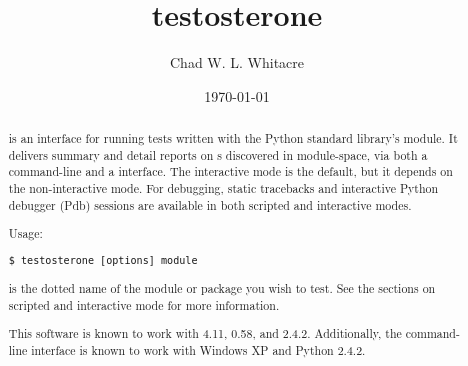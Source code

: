 \documentclass{manual}
\title{testosterone}
\author{Chad W. L. Whitacre}
\date\today
\begin{document}
\maketitle

\begin{abstract}

\noindent

 is an interface for running tests written with the Python
standard library's  module. It delivers summary and detail
reports on s discovered in module-space, via both a command-line
and a  interface. The interactive mode is the default, but it
depends on the non-interactive mode. For debugging, static tracebacks and
interactive Python debugger (Pdb) sessions are available in both scripted and
interactive modes.

Usage:

\begin{verbatim}
$ testosterone [options] module
\end{verbatim}

 is the dotted name of the module or package you wish to test. See
the sections on scripted and interactive mode for more information.

This software is known to work with 
4.11,  0.58,
and  2.4.2. Additionally, the command-line
interface is known to work with Windows XP and Python 2.4.2.


\end{abstract}




\end{document}
